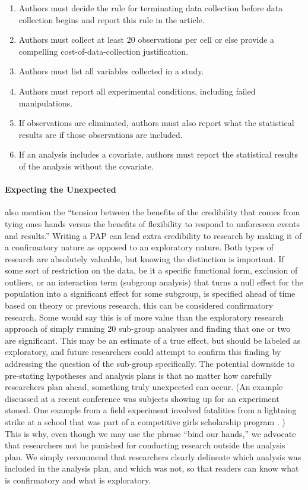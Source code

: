 \documentclass[12pt] {article}
\begin{document}
\begin{enumerate}
\def\labelenumi{\arabic{enumi}.}
\item
  Authors must decide the rule for terminating data collection before
  data collection begins and report this rule in the article.
\item
  Authors must collect at least 20 observations per cell or else provide
  a compelling cost-of-data-collection justification.
\item
  Authors must list all variables collected in a study.
\item
  Authors must report all experimental conditions, including failed
  manipulations.
\item
  If observations are eliminated, authors must also report what the
  statistical results are if those observations are included.
\item
  If an analysis includes a covariate, authors must report the
  statistical results of the analysis without the covariate.
\end{enumerate}

\paragraph{Expecting the Unexpected}
\cite{glennerster_running_2013} also mention the ``tension between
the benefits of the credibility that comes from tying ones hands versus
the benefits of flexibility to respond to unforeseen events and
results.'' Writing a PAP can lend extra credibility to research by making it of a confirmatory nature as opposed to an exploratory nature.
Both types of research are absolutely valuable, but knowing the distinction is important. If some sort of restriction on the data, be it a specific functional form, exclusion of outliers, or an interaction term (subgroup analysis) that turns a null effect for the population into a significant effect for some subgroup, is specified ahead of time based on theory or previous research, this can be considered confirmatory research. Some would say this is of more value than the exploratory research approach of simply running 20 sub-group analyses and finding that one or two are significant. This may be an estimate of a true effect, but should be labeled as exploratory, and future researchers could attempt to confirm this finding by addressing the question of the sub-group specifically. The potential downside to pre-stating hypotheses and analysis plans is that no matter how carefully researchers plan ahead, something truly unexpected can occur. (An example discussed at a recent conference was subjects showing up for an experiment stoned. One example from a field experiment involved fatalities from a lightning strike at a school that was part of a competitive girls scholarship program \citep{kremer2009incentives}. ) This is why, even though we may use the phrase ``bind our hands,'' we advocate that researchers not be punished for conducting research outside the analysis plan. We simply recommend that researchers clearly delineate which analysis was included in the analysis plan, and which was not, so that readers can know what is confirmatory and what is exploratory.
\end{document}
